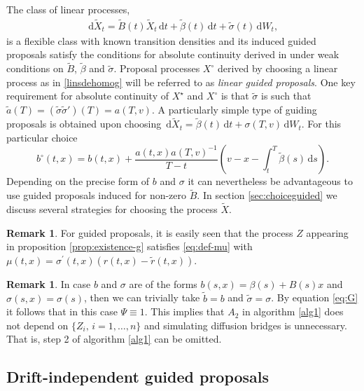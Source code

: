 \documentclass[preprint]{imsart}
\newcommand{\si}{\sigma}
\renewcommand{\tilde}{\widetilde}
\theoremstyle{definition}
\newtheorem{rem}[thm]{Remark}
\newcommand{\dd}{{\,\mathrm d}}
\newcommand{\T}{{\prime}}
\begin{document}
The class of linear processes,
\begin{align}\label{linsdehomog}
		\dd  \tilde X_t = \tilde B(t) \tilde X_t\dd t  + \tilde\beta(t)  \dd t +  \tilde \sigma(t)  \dd  W_t,
\end{align}
 is a flexible class  with known transition densities and its induced guided proposals  satisfy the conditions for absolute continuity derived in \cite{Schauer} under weak conditions on $\tilde{B}$, $\tilde\beta$ and $\tilde{\sigma}$. Proposal processes $X^\circ$ derived by choosing a linear process as in \eqref{linsdehomog} will be referred to as {\it linear guided proposals}. One key requirement for absolute continuity of $X^\star$ and $X^\circ$ is that $\tilde\sigma$ is such that $\tilde{a}(T)=(\tilde\sigma \tilde\sigma')(T)= a(T,v)$. 
A particularly simple type of guiding proposals is obtained upon choosing $\dd\tilde{X}_t = \tilde\beta(t) \dd t+ \si(T,v) \dd W_t$. For this particular choice
\begin{equation}\label{eq:simple-linear} b^\circ(t,x)= b(t,x)  + \frac{a(t, x) a(T,v)^{-1}}{T-t}\left(v-x- \int_t^T \tilde\beta(s) \dd s\right). \end{equation}
 Depending on the precise form of $b$ and $\si$ it can nevertheless be  advantageous to use guided proposals induced for non-zero $\tilde{B}$. In section \ref{sec:choiceguided} we discuss several strategies for choosing the process $\tilde{X}$.  
\begin{rem}
For  guided proposals,  it is easily seen that the process  $Z$ appearing in proposition \ref{prop:existence-g} satisfies \eqref{eq:def-mu} with 
$\mu(t,x)=\si^\T (t,x) \left(r(t,x) - \tilde{r}(t,x)\right)$.
\end{rem}

\begin{rem}
In case $b$ and $\si$ are of the forms $b(s,x)=\beta(s) + B(s) x$ and $\si(s,x)=\si(s)$, then we can trivially take $\tilde{b}=b$ and $\tilde\si=\si$. By equation \eqref{eq:G} it follows that in this case $\Psi\equiv 1$. This implies that $A_2$ in algorithm \ref{alg1} does not depend on $\{Z_i,\, i=1,\ldots, n\}$ and simulating diffusion bridges is unnecessary. That is, step 2 of algorithm \ref{alg1} can be omitted.  
\end{rem}


\subsection{Drift-independent guided proposals}\label{sec:adjustedguided-proposals}
\end{document}
